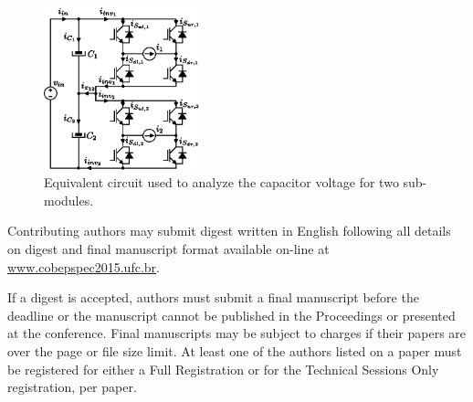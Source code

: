 \documentclass[a4paper,oneside,onecolumn,draftcls,12pt,conference]{IEEEtran}
\begin{document}
\begin{figure} 
	\vspace{-20pt}
	\begin{center}
	\includegraphics[width=0.4\textwidth]{Figs/MHF1F_ix.eps}
	\caption{Equivalent circuit used to analyze the capacitor voltage for two sub-modules.}
	\label{fig:MHF1F_ix3}
	\end{center}
	\vspace{-20pt}
	\vspace{1pt}
\end{figure} 


Contributing authors may submit digest written in English following all details on digest and final manuscript format available on-line at \url{www.cobepspec2015.ufc.br}.



If a digest is accepted, authors must submit a final manuscript before the deadline or the manuscript cannot be published in the Proceedings or presented at the conference. Final manuscripts may be subject to charges if their papers are over the page or file size limit. At least one of the authors listed on a paper must be registered for either a Full Registration or for the Technical Sessions Only registration, per paper.




%
%
\end{document}
